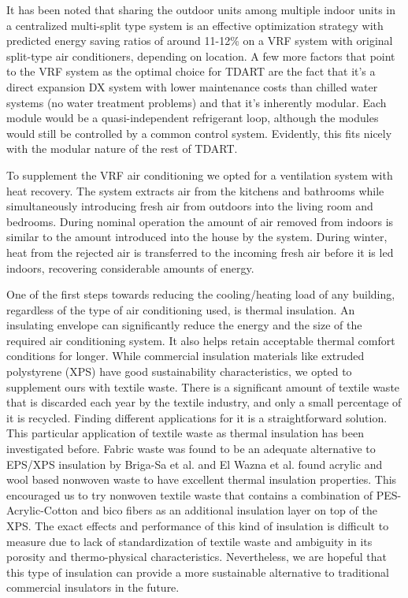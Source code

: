 \documentclass[justified]{tufte-book}
\begin{document}
	It has been noted that sharing the outdoor units among multiple indoor units in a centralized multi-split type system is an effective optimization strategy\cite{li2017simulation} with predicted energy saving ratios of around 11-12\% on a VRF system with original split-type air conditioners, depending on location. A few more factors that point to the VRF system as the optimal choice for TDART are the fact that it's a direct expansion DX system with lower maintenance costs than chilled water systems (no water treatment problems) and that it's inherently modular. Each module would be a quasi-independent refrigerant loop, although the modules would still be controlled by a common control system. Evidently, this fits nicely with the modular nature of the rest of TDART.
\par To supplement the VRF air conditioning we opted for a ventilation system with heat recovery. The system extracts air from the kitchens and bathrooms while simultaneously introducing fresh air from outdoors into the living room and bedrooms. During nominal operation the amount of air removed from indoors is similar to the amount introduced into the house by the system. During winter, heat from the rejected air is transferred to the incoming fresh air before it is led indoors, recovering considerable amounts of energy.
\par    
One of the first steps towards reducing the cooling/heating load of any building, regardless of the type of air conditioning used, is thermal insulation. An insulating envelope can significantly reduce the energy and the size of the required air conditioning system. It also helps retain acceptable thermal comfort conditions for longer. While commercial insulation materials like extruded polystyrene (XPS) have good sustainability characteristics, we opted to supplement ours with textile waste. There is a significant amount of textile waste that is discarded each year by the textile industry, and only a small percentage of it is recycled. Finding different applications for it is a straightforward solution. This particular application of textile waste as thermal insulation has been investigated before. Fabric waste was found to be an adequate alternative to EPS/XPS insulation by Briga-Sa et al.\cite{briga2013textile} and El Wazna et al.\cite{el2017thermo} found acrylic and wool based nonwoven waste to have excellent thermal insulation properties. This encouraged us to try nonwoven textile waste that contains a combination of PES-Acrylic-Cotton and bico fibers as an additional insulation layer on top of the XPS. The exact effects and performance of this kind of insulation is difficult to measure due to lack of standardization of textile waste and ambiguity in its porosity and thermo-physical characteristics. Nevertheless, we are hopeful that this type of insulation can provide a more sustainable alternative to traditional commercial insulators in the future.\\
\end{document}
